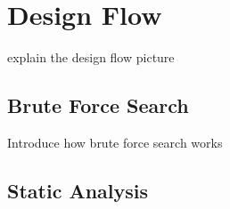 \section{Design Flow}
\label{sec:designflow}

explain the design flow picture

  \subsection{Brute Force Search}
  \label{sec:bruteforcesearch}

  Introduce how brute force search works

  \subsection{Static Analysis}
  \label{sec:staticanalysis}
